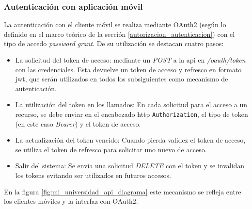\subsubsection{Autenticación con aplicación móvil}
\label{autenticacion_con_app}

La autenticación con el cliente móvil se realiza mediante OAuth2 (según lo definido en el marco teórico de la sección \ref{autorizacion_autenticacion}) con el tipo de accedo \textit{password grant}. De su utilización se destacan cuatro pasos:
\begin{itemize}
\item La solicitud del token de acceso: mediante un \textit{POST} a la \gls{api} en \textit{/oauth/token} con las credenciales. Esta devuelve un token de acceso y refresco en formato \gls{jwt}, que serán utilizados en todos los  subsiguientes como mecanismo de autenticación.
\item La utilización del token en los llamados: En cada solicitud para el acceso a un recurso, se debe enviar en el encabezado \gls{http} \lstinline{Authorization}, el tipo de token (en este caso \textit{Bearer}) y el token de acceso.
\item La actualización del token vencido: Cuando pierda validez el token de acceso, se utiliza el token de refresco para solicitar uno nuevo de acceso.
\item Salir del sistema: Se envía una solicitud \textit{DELETE} con el token y se invalidan los tokens evitando ser utilizados en futuros accesos.
\end{itemize}

En la figura \ref{fig:mi_universidad_api_diagrama} este mecanismo se refleja entre los clientes móviles y la interfaz con OAuth2.